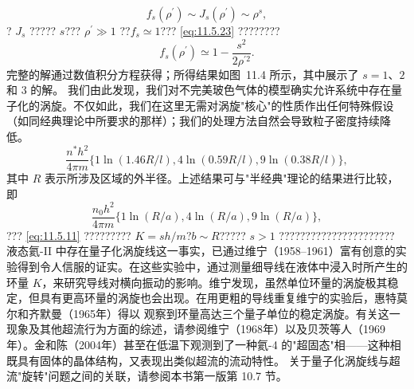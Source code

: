 \begin{equation}\tag{11.5.26}\label{eq:11.5.26}
f _ { s } ( \rho ^{\prime} ) \sim J _ { s } ( \rho ^{\prime} ) \sim \rho ^{s} ,
\end{equation}
? \(J_{s}\) ????? \(s\)??? \(\rho^{\prime} \gg 1\) ??\(f_{s}\simeq 1\)??? \autoref{eq:11.5.23} ????????
\begin{equation}\tag{11.5.27}\label{eq:11.5.27}
f _ { s } ( \rho ^{\prime} ) \simeq 1 - \frac { s ^{2} } { 2 \rho ^{\prime 2} } .
\end{equation}
完整的解通过数值积分方程获得；所得结果如图~11.4 所示，其中展示了 \(s=1、2\) 和 \(3\) 的解。
我们由此发现，我们对不完美玻色气体的模型确实允许系统中存在量子化的涡旋。不仅如此，我们在这里无需对涡旋"核心"的性质作出任何特殊假设（如同经典理论中所要求的那样）；我们的处理方法自然会导致粒子密度持续降低。
\begin{equation}\tag{11.5.28}\label{eq:11.5.28}
\frac { n ^{*} h ^{2} } { 4 \pi m } \{ 1 \ln ( 1 . 46 R / l ) ,  4 \ln ( 0 . 59 R / l ) ,  9 \ln ( 0 . 38 R / l ) \} ,
\end{equation}
其中 \(R\) 表示所涉及区域的外半径。上述结果可与"半经典"理论的结果进行比较，即
\begin{equation}\tag{11.5.29}\label{eq:11.5.29}
\frac { n _ { 0 } h ^{2} } { 4 \pi m } \{ 1 \ln ( R / a ) ,  4 \ln ( R / a ) ,  9 \ln ( R / a ) \} ,
\end{equation}
??? \autoref{eq:11.5.11} ????????? \(K=sh/m\)?\(b\sim R\)????? \(s>1\) ??????????????????????
液态氦-II 中存在量子化涡旋线这一事实，已通过维宁（1958--1961）富有创意的实验得到令人信服的证实。在这些实验中，通过测量细导线在液体中浸入时所产生的环量 \(K\)，来研究导线对横向振动的影响。维宁发现，虽然单位环量的涡旋极其稳定，但具有更高环量的涡旋也会出现。在用更粗的导线重复维宁的实验后，惠特莫尔和齐默曼（1965年）得以
观察到环量高达三个量子单位的稳定涡旋。有关这一现象及其他超流行为方面的综述，请参阅维宁（1968年）以及贝茨等人（1969年）。金和陈（2004年）甚至在低温下观测到了一种氦-4 的"超固态"相——这种相既具有固体的晶体结构，又表现出类似超流的流动特性。
关于量子化涡旋线与超流"旋转"问题之间的关联，请参阅本书第一版第 10.7 节。
